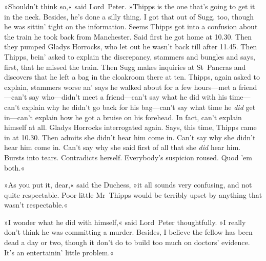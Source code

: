 »Shouldn't think so,« said Lord~Peter. »Thipps is the one that's going to get it in the neck. Besides, he's done a silly thing. I got that out of Sugg, too, though he was sittin' tight on the information. Seems Thipps got into a confusion about the train he took back from Manchester. Said first he got home at 10.30. Then they pumped Gladys Horrocks, who let out he wasn't back till after 11.45. Then Thipps, bein' asked to explain the discrepancy, stammers and bungles and says, first, that he missed the train. Then Sugg makes inquiries at St~Pancras and discovers that he left a bag in the cloakroom there at ten. Thipps, again asked to explain, stammers worse an' says he walked about for a few hours—met a friend—can't say who—didn't meet a friend—can't say what he did with his time—can't explain why he didn't go back for his bag—can't say what time he \textit{did} get in—can't explain how he got a bruise on his forehead. In fact, can't explain himself at all. Gladys Horrocks interrogated again. Says, this time, Thipps came in at 10.30. Then admits she didn't hear him come in. Can't say why she didn't hear him come in. Can't say why she said first of all that she \textit{did} hear him. Bursts into tears. Contradicts herself. Everybody's suspicion roused. Quod 'em both.«

»As you put it, dear,« said the Duchess, »it all sounds very confusing, and not quite respectable. Poor little Mr~Thipps would be terribly upset by anything that wasn't respectable.«

»I wonder what he did with himself,« said Lord~Peter thoughtfully. »I really don't think he was committing a murder. Besides, I believe the fellow has been dead a day or two, though it don't do to build too much on doctors' evidence. It's an entertainin' little problem.«

